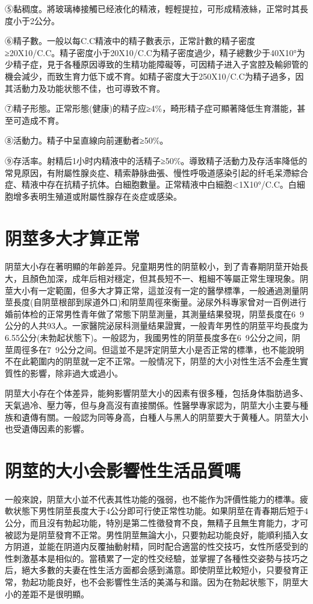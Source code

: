 \documentclass[12pt,UTF8]{ctexbook}
\begin{document}
⑤黏稠度。將玻璃棒接觸已经液化的精液，輕輕提拉，可形成精液絲，正常时其長度小于2公分。

⑥精子數。一般以每C.C精液中的精子數表示，正常計數的精子密度≥20X10/C.C。精子密度小于20X10/C.C为精子密度過少，精子總數少于40X10°为少精子症，見于各種原因導致的生精功能障礙等，可因精子进入子宮腔及輸卵管的機会減少，而致生育力低下或不育。如精子密度大于250X10/C.C为精子過多，因其活動力及功能状態不佳，也可導致不育。

⑦精子形態。正常形態(健康)的精子应≥4\%，畸形精子症可顯著降低生育潛能，甚至可造成不育。

⑧活動力。精子中呈直線向前運動者≥50\%。

⑨存活率。射精后1小时内精液中的活精子≥50\%。導致精子活動力及存活率降低的常見原因，有附屬性腺炎症、精索静脉曲張、慢性呼吸道感染引起的纤毛呆滯綜合症、精液中存在抗精子抗体。白細胞數量。正常精液中白細胞<1X10°/C.C。白細胞增多表明生殖道或附屬性腺存在炎症或感染。

\section{阴莖多大才算正常}

阴莖大小存在著明顯的年齡差异。兒童期男性的阴莖較小，到了青春期阴莖开始長大，且顏色加深，成年后相对穩定，但其長短不一、粗細不等屬正常生理現象。阴莖大小有一定範圍，但多大才算正常，這並沒有一定的醫學標準，一般通過測量阴莖長度(自阴莖根部到尿道外口)和阴莖周徑來衡量。泌尿外科專家曾对一百例进行婚前体检的正常男性青年做了常態下阴莖測量，其測量结果發現，阴莖長度在6~9公分的人共93人。一家醫院泌尿科测量结果證實，一般青年男性的阴莖平均長度为6.55公分(未勃起状態下)。一般認为，我國男性的阴莖長度多在6~9公分之间，阴莖周徑多在7~9公分之间。但這並不是評定阴莖大小是否正常的標準，也不能說明不在此範圍内的阴莖就一定不正常。一般情况下，阴莖的大小对性生活不会產生實質性的影響，除非過大或過小。

阴莖大小存在个体差异，能夠影響阴莖大小的因素有很多種，包括身体脂肪過多、天氣過冷、壓力等，但与身高沒有直接關係。性醫學專家認为，阴莖大小主要与種族和遺傳有關。一般認为同等身高，白種人与黑人的阴莖要大于黄種人。阴莖大小也受遺傳因素的影響。

\section{阴莖的大小会影響性生活品質嗎}

一般來說，阴莖大小並不代表其性功能的强弱，也不能作为評價性能力的標準。疲軟状態下男性阴莖長度大于4公分即可行使正常性功能。如果阴莖在青春期后短于4公分，而且沒有勃起功能，特別是第二性徵發育不良，無精子且無生育能力，才可被認为是阴莖發育不正常。男性阴莖無論大小，只要勃起功能良好，能順利插入女方阴道，並能在阴道内反覆抽動射精，同时配合適當的性交技巧，女性所感受到的性刺激基本是相似的。當積累了一定的性交经驗，並掌握了各種性交姿勢与技巧之后，絕大多數的夫妻在性生活方面都会感到滿意。即使阴莖比較短小，只要發育正常，勃起功能良好，也不会影響性生活的美滿与和諧。因为在勃起状態下，阴莖大小的差距不是很明顯。
\end{document}

